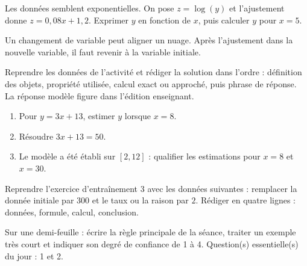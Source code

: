 \begin{activite}
Les données semblent exponentielles. On pose $z=\log(y)$ et l'ajustement donne $z=0{,}08x+1{,}2$. Exprimer $y$ en fonction de $x$, puis calculer $y$ pour $x=5$.

\end{activite}

\begin{traceecrite}Un changement de variable peut aligner un nuage. Après l'ajustement dans la nouvelle variable, il faut revenir à la variable initiale.\end{traceecrite}

\begin{exemple}
Reprendre les données de l'activité et rédiger la solution dans l'ordre : définition des objets, propriété utilisée, calcul exact ou approché, puis phrase de réponse. La réponse modèle figure dans l'édition enseignant.
\end{exemple}

\begin{exercice}[-- essentiel]
\begin{enumerate}\item Pour $y=3x+13$, estimer $y$ lorsque $x=8$.\item Résoudre $3x+13=50$.\item Le modèle a été établi sur $[2,12]$ : qualifier les estimations pour $x=8$ et $x=30$.\end{enumerate}
\end{exercice}


\begin{dm}Reprendre l'exercice d'entraînement 3 avec les données suivantes : remplacer la donnée initiale par $300$ et le taux ou la raison par $2$. Rédiger en quatre lignes : données, formule, calcul, conclusion.\end{dm}

\begin{sortie}Sur une demi-feuille : écrire la règle principale de la séance, traiter un exemple très court et indiquer son degré de confiance de 1 à 4. Question(s) essentielle(s) du jour : 1 et 2.\end{sortie}

